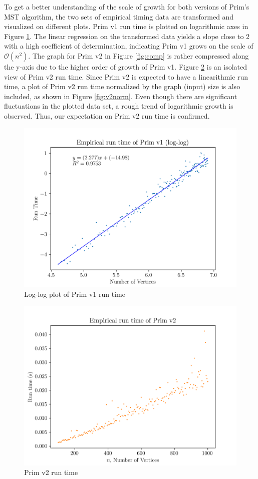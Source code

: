 \documentclass[titlepage, 12pt]{article}
\begin{document}
To get a better understanding of the scale of growth for both versions of Prim's
MST algorithm, the two sets of empirical timing data are transformed and
visualized on different plots. Prim v1 run time is plotted on logarithmic axes
in Figure \ref{fig:v1log}. The linear regression on the transformed data yields
a slope close to 2 with a high coefficient of determination, indicating Prim v1
grows on the scale of \(\mathcal{O}(n^2)\). The graph for Prim v2 in Figure
\ref{fig:comp} is rather compressed along the y-axis due to the higher order of
growth of Prim v1. Figure \ref{fig:v2} is an isolated view of Prim v2 run time.
Since Prim v2 is expected to have a linearithmic run time, a plot of Prim v2 run
time normalized by the graph (input) size is also included, as shown in Figure
\ref{fig:v2norm}. Even though there are significant fluctuations in the plotted
data set, a rough trend of logarithmic growth is observed. Thus, our expectation
on Prim v2 run time is confirmed.
\begin{figure}[h]
  \centering
  \includegraphics[width=0.8\linewidth]{v1log} 
  \caption{Log-log plot of Prim v1 run time}
  \label{fig:v1log}
\end{figure}
\begin{figure}[h]
  \centering
  \includegraphics[width=0.8\linewidth]{v2} 
  \caption{Prim v2 run time}
  \label{fig:v2}
\end{figure}
\end{document}
